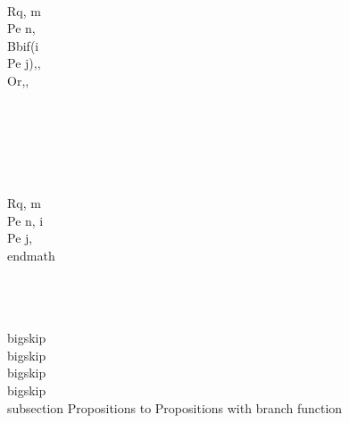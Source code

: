 \\Rq, m \\Pe n, \\Bb{if(i \\Pe j)}{,}{, \\Or,},  \\\\\\\\\\\\
\\Rq, m \\Pe n, i \\Pe j,
\\end{math}



\\[,i \\Pe j, m \\nPe n, \\Rq , m \\nPe n, i \\Pe j,\\]
\\[,i \\nPe j, m \\nPe n, \\Rq , m \\nPe n, i \\nPe j,\\]

\\bigskip
\\bigskip
\\bigskip
\\bigskip
\\subsection{ Propositions to Propositions with branch function}
\\[, \\Bb{if(i \\Pe j)}{,m \\nPe n,}{,}, \\Rq , \\Bb{if(m \\Pe n)}{,i \\nPe j,}{,},\\]

